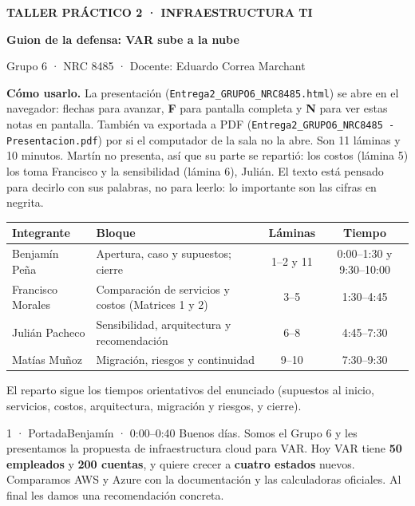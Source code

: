 \documentclass[11pt]{article}
\begin{document}
\begin{center}
{\sffamily\bfseries\color{awsorange} TALLER PRÁCTICO 2 · INFRAESTRUCTURA TI\par}
\vspace{2pt}
{\sffamily\bfseries\color{navy}\LARGE Guion de la defensa: VAR sube a la nube\par}
\vspace{2pt}
{\sffamily Grupo 6 · NRC 8485 · Docente: Eduardo Correa Marchant\par}
\end{center}

\textbf{Cómo usarlo.} La presentación (\texttt{Entrega2\_GRUPO6\_NRC8485.html}) se abre en el navegador: flechas para avanzar, \textbf{F} para pantalla completa y \textbf{N} para ver estas notas en pantalla. También va exportada a PDF (\texttt{Entrega2\_GRUPO6\_NRC8485 - Presentacion.pdf}) por si el computador de la sala no la abre. Son 11 láminas y 10 minutos. Martín no presenta, así que su parte se repartió: los costos (lámina 5) los toma Francisco y la sensibilidad (lámina 6), Julián. El texto está pensado para decirlo con sus palabras, no para leerlo: lo importante son las cifras en negrita.

{\small
\begin{tabularx}{\linewidth}{@{}lXcc@{}}
\toprule
\textbf{Integrante} & \textbf{Bloque} & \textbf{Láminas} & \textbf{Tiempo}\\
\midrule
Benjamín Peña & Apertura, caso y supuestos; cierre & 1--2 y 11 & 0:00--1:30 y 9:30--10:00\\
Francisco Morales & Comparación de servicios y costos (Matrices 1 y 2) & 3--5 & 1:30--4:45\\
Julián Pacheco & Sensibilidad, arquitectura y recomendación & 6--8 & 4:45--7:30\\
Matías Muñoz & Migración, riesgos y continuidad & 9--10 & 7:30--9:30\\
\bottomrule
\end{tabularx}}

El reparto sigue los tiempos orientativos del enunciado (supuestos al inicio, servicios, costos, arquitectura, migración y riesgos, y cierre).

\begin{lamina}{1 · Portada}{Benjamín · 0:00--0:40}
Buenos días. Somos el Grupo 6 y les presentamos la propuesta de infraestructura cloud para VAR. Hoy VAR tiene \textbf{50 empleados} y \textbf{200 cuentas}, y quiere crecer a \textbf{cuatro estados} nuevos. Comparamos AWS y Azure con la documentación y las calculadoras oficiales. Al final les damos una recomendación concreta.
\end{lamina}
\end{document}
